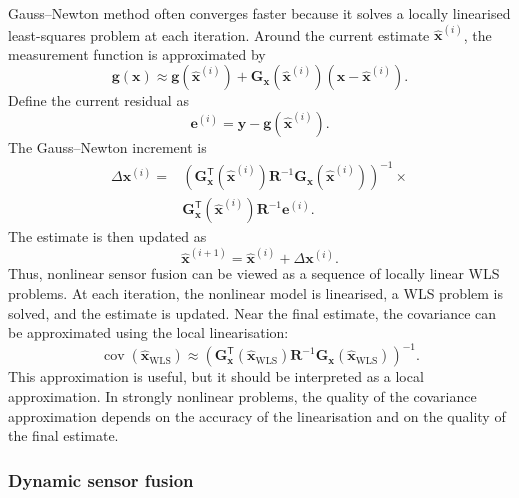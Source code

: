 \documentclass{ieeeaccess}
\begin{document}
Gauss--Newton method often converges faster because it solves a locally linearised least-squares problem at each iteration. Around the current estimate $\widehat{\mathbf{x}}^{(i)}$, the measurement function is approximated by
\begin{equation}
\mathbf{g}(\mathbf{x}) \approx \mathbf{g} \left( \widehat{\mathbf{x}}^{(i)} \right) + \mathbf{G}_{\mathbf{x}} \left( \widehat{\mathbf{x}}^{(i)} \right) \left( \mathbf{x} - \widehat{\mathbf{x}}^{(i)} \right).
\end{equation}
Define the current residual as
\begin{equation}
\mathbf{e}^{(i)} = \mathbf{y} - \mathbf{g} \left( \widehat{\mathbf{x}}^{(i)} \right).
\end{equation}
The Gauss--Newton increment is
\begin{align}
\Delta \mathbf{x}^{(i)} = &\left(
\mathbf{G}_{\mathbf{x}}^{\mathsf T}
\left(
\widehat{\mathbf{x}}^{(i)}
\right)
\mathbf{R}^{-1}
\mathbf{G}_{\mathbf{x}}
\left(
\widehat{\mathbf{x}}^{(i)}
\right)
\right)^{-1} \times \nonumber \\
&\mathbf{G}_{\mathbf{x}}^{\mathsf T}
\left(
\widehat{\mathbf{x}}^{(i)}
\right)
\mathbf{R}^{-1}
\mathbf{e}^{(i)}.
\end{align}
The estimate is then updated as
\begin{equation}
\widehat{\mathbf{x}}^{(i+1)} = \widehat{\mathbf{x}}^{(i)} + \Delta \mathbf{x}^{(i)}.
\end{equation}
Thus, nonlinear sensor fusion can be viewed as a sequence of locally linear WLS problems. At each iteration, the nonlinear model is linearised, a WLS problem is solved, and the estimate is updated. Near the final estimate, the covariance can be approximated using the local linearisation:
\begin{equation}
\operatorname{cov} \left( \widehat{\mathbf{x}}_{\mathrm{WLS}} \right) \approx \left(\mathbf{G}_{\mathbf{x}}^{\mathsf T}\left(\widehat{\mathbf{x}}_{\mathrm{WLS}}\right) \mathbf{R}^{-1} \mathbf{G}_{\mathbf{x}} \left( \widehat{\mathbf{x}}_{\mathrm{WLS}} \right)\right)^{-1}.
\end{equation}
This approximation is useful, but it should be interpreted as a local approximation. In strongly nonlinear problems, the quality of the covariance approximation depends on the accuracy of the linearisation and on the quality of the final estimate.

\subsubsection{Dynamic sensor fusion}
\end{document}
